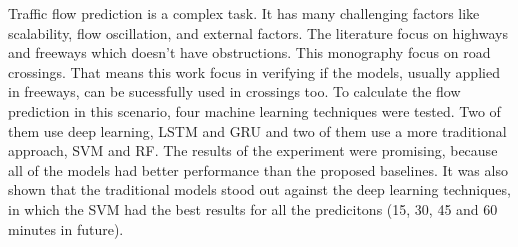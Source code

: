 Traffic flow prediction is a complex task. It has many challenging factors like scalability, flow oscillation, and external factors. The literature focus on highways and freeways which doesn't have obstructions. This monography focus on road crossings. That means this work focus in verifying if the models, usually applied in freeways, can be sucessfully used in crossings too. To calculate the flow prediction in this scenario, four machine learning techniques were tested. Two of them use deep learning, \acrfull{LSTM} and \acrfull{GRU} and two of them use a more traditional approach, \acrfull{SVM} and \acrfull{RF}. The results of the experiment were promising, because all of the models had better performance than the proposed baselines. It was also shown that the traditional models stood out against the deep learning techniques, in which the \acrfull{SVM} had the best results for all the predicitons (15, 30, 45 and 60 minutes in future).


